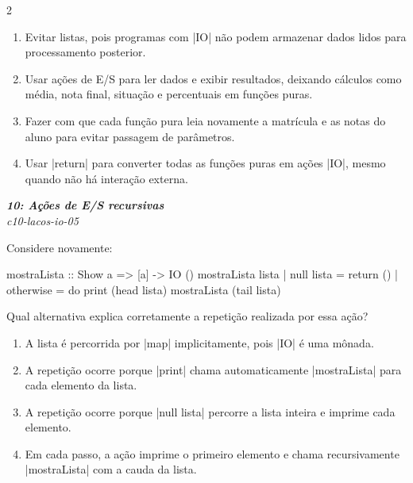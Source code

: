 \documentclass[a4paper,10pt,brazil]{article}
\begin{document}
\begin{multicols}{2}
\begin{enumerate}
  \item Evitar listas, pois programas com \haskellinline|IO| não podem armazenar dados lidos para processamento posterior.

  \item Usar ações de E/S para ler dados e exibir resultados, deixando cálculos como média, nota final, situação e percentuais em funções puras.

  \item Fazer com que cada função pura leia novamente a matrícula e as notas do aluno para evitar passagem de parâmetros.

  \item Usar \haskellinline|return| para converter todas as funções puras em ações \haskellinline|IO|, mesmo quando não há interação externa.


\end{enumerate}

\begin{flushright}
  \footnotesize
  \textit{\textbf{10: Ações de E/S recursivas}}\\
  \textit{c10-lacos-io-05}\\

\end{flushright}
Considere novamente:

\begin{haskellcode}
mostraLista :: Show a => [a] -> IO ()
mostraLista lista
  | null lista = return ()
  | otherwise = do
      print (head lista)
      mostraLista (tail lista)
\end{haskellcode}

Qual alternativa explica corretamente a repetição realizada por essa ação?

\begin{enumerate}
  \item A lista é percorrida por \haskellinline|map| implicitamente, pois \haskellinline|IO| é uma mônada.

  \item A repetição ocorre porque \haskellinline|print| chama automaticamente \haskellinline|mostraLista| para cada elemento da lista.

  \item A repetição ocorre porque \haskellinline|null lista| percorre a lista inteira e imprime cada elemento.

  \item Em cada passo, a ação imprime o primeiro elemento e chama recursivamente \haskellinline|mostraLista| com a cauda da lista.


\end{enumerate}
\end{multicols}
\end{document}
